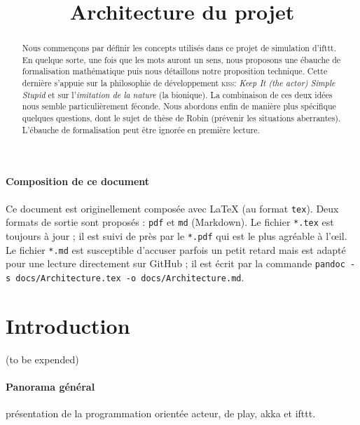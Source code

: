\documentclass[11pt]{article}
\title{Architecture du projet}
\begin{document}
\maketitle

\begin{abstract}
Nous commençons par définir les concepts utilisés dans ce projet de simulation d'ifttt. En quelque sorte, une fois que les mots auront un sens, nous proposons une ébauche de formalisation mathématique puis nous détaillons notre proposition technique. Cette dernière s'appuie sur la philosophie de développement \textsc{kiss}: \textsl{Keep It (the actor) Simple Stupid} et sur l'\textsl{imitation de la nature} (la bionique). La combinaison de ces deux idées nous semble particulièrement féconde. Nous abordons enfin de manière plus spécifique quelques questions, dont le sujet de thèse de Robin (prévenir les situations aberrantes). L'ébauche de formalisation peut être ignorée en première lecture.
\end{abstract}

\paragraph{Composition de ce document} Ce document est originellement composée avec \LaTeX{} (au format \texttt{tex}). Deux formats de sortie sont proposés : \texttt{pdf} et \texttt{md} (Markdown). Le fichier \texttt{*.tex} est toujours à jour ; il est suivi de près par le \texttt{*.pdf} qui est le plus agréable à l'œil. Le fichier \texttt{*.md} est susceptible d'accuser parfois un petit retard mais est adapté pour une lecture directement sur GitHub ; il est écrit par la commande \texttt{pandoc -s docs/Architecture.tex -o docs/Architecture.md}.

\tableofcontents

\section{Introduction}

(to be expended)

\paragraph{Panorama général} présentation de la programmation orientée acteur, de play, akka et ifttt.
\end{document}
